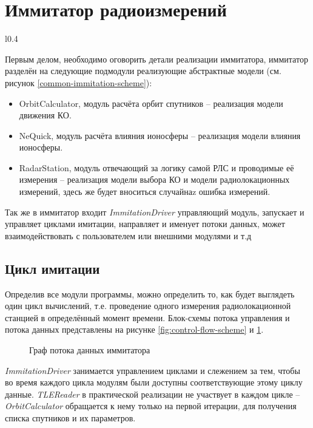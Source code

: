 \section{Иммитатор радиоизмерений}

\begin{wrapfigure}[22]{l}{0.4\textwidth}
	\begin{center}
		
	\end{center}
	\caption{Граф потока управления иммитатора} \label{fig:control-flow-scheme}
\end{wrapfigure}
Первым делом, необходимо оговорить детали реализации иммитатора, иммитатор разделён на следующие подмодули
реализующие абстрактные модели (см. рисунок \ref{common-immitation-scheme}):
\begin{itemize}
	\item OrbitCalculator, модуль расчёта орбит спутников -- реализация модели движения КО.
	\item NeQuick, модуль расчёта влияния ионосферы -- реализация модели влияния ионосферы.
	\item RadarStation, модуль отвечающий за логику самой РЛС и проводимые её измерения -- реализация модели выбора
			КО и модели радиолокационных измерений, здесь же будет вноситься случайнаz ошибка измерений.
\end{itemize}

Так же в иммитатор входит \textit{ImmitationDriver} управляющий модуль, запускает и управляет циклами имитации,
направляет и именует потоки данных, может взаимодействовать с пользователем или внешними модулями и т.д

\subsection{Цикл имитации}

Определив все модули программы, можно определить то, как будет выглядеть один цикл вычислений, т.е. проведение
одного измерения радиолокационной станцией в определённый момент времени. Блок-схемы потока управления и потока
данных представлены на рисунке \ref{fig:control-flow-scheme} и \ref{fig:data-flow-scheme}.
\begin{figure}[H]
	\centering
	
	\caption{Граф потока данных иммитатора} \label{fig:data-flow-scheme}
\end{figure}

\textit{ImmitationDriver} занимается управлением циклами и слежением за тем, чтобы во время каждого цикла модулям
были доступны соответствующие этому циклу данные. \textit{TLEReader} в практической реализации не участвует в каждом 
цикле -- \textit{OrbitCalculator} обращается к нему только на первой итерации, для получения списка спутников 
и их параметров.

